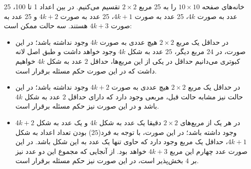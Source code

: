 \p
خانه‌های صفحه 
$10\times10$
را به 25 مربع
$2\times2$
تقسیم می‌کنیم. در بین اعداد 1 تا 100، 25 عدد به صورت
$4k$،
25 عدد به صورت
$4k + 1$،
25 عدد به صورت
$4k + 2$
و 25 عدد به صورت 
$4k + 3$
هستند.
سه حالت ممکن است:
\begin{itemize}
    \item 
    در حداقل یک مربع
    $2\times2$
    هیچ عددی به صورت
    $4k$
    وجود نداشته باشد؛ در این صورت، در
    $24$
    مربع دیگر،
    $25$
    عدد به شکل
    $4k$
    وجود خواهد داشت و طبق اصل لانه کبوتری می‌دانیم حداقل در یکی از این مربع‌ها،
    حداقل
    $2$
    عدد به شکل
    $4k$
    خواهیم داشت که در این صورت حکم مسئله برقرار است.

    \item 
    در حداقل یک مربع
    $2\times2$
    هیچ عددی به صورت
    $4k+2$
    وجود نداشته باشد؛ در این حالت نیز مشابه حالت قبل،
    مربعی وجود دارد که دارای
    حداقل
    $2$
    عدد به شکل
    $4k$
    باشد و در این صورت نیز حکم مسئله برقرار است.

    \item 
    در هر یک از مربع‌های
    $2\times2$
    دقیقا یک عدد به شکل
    $4k$
    و یک عدد به شکل
    $4k+2$
    وجود داشته باشد؛
    در این صورت، با توجه به فرد($25$)
    بودن تعداد اعداد به شکل
    $4k+1$،
    حداقل یک مربع وجود دارد که حاوی تنها یک عدد به این شکل باشد.
    در این صورت عدد چهارم این مربع
    $4k+3$
    خواهد بود. از آنجایی که مجموع این دو عدد نیز بر
    $4$
    بخش‌پذیر است، در این صورت نیز حکم مسئله برقرار است.
\end{itemize}